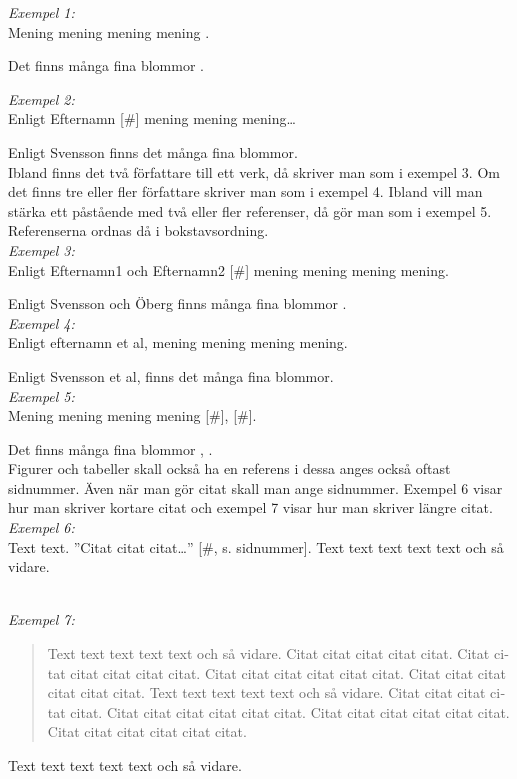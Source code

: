 \documentclass[a4paper,12pt]{article} %
\begin{document}
{\em Exempel 1:}\\
Mening mening mening mening \cite{sven01}. 

Det finns många fina blommor \cite{sven01}.

{\em Exempel 2:}\\
Enligt Efternamn [\#] mening mening mening…

Enligt Svensson \cite{sven01} finns det många fina blommor.\\

Ibland finns det två författare till ett verk, då skriver man som i exempel 3. Om det finns tre eller fler författare skriver man som i exempel 4. Ibland vill man stärka ett påstående med två eller fler referenser, då gör man som i exempel 5. Referenserna ordnas då i bokstavsordning. \\

{\em Exempel 3:}\\
Enligt Efternamn1 och Efternamn2 [\#] mening mening mening mening. 

Enligt Svensson och Öberg finns många fina blommor \cite{sven02}.\\

{\em Exempel 4:}\\
Enligt efternamn et al, \cite{Creswell2014} mening mening mening mening.

Enligt Svensson et al, \cite{sven07} finns det många fina blommor.\\

{\em Exempel 5:}\\ 
Mening mening mening mening [\#], [\#]. 

Det finns många fina blommor \cite{sven01}, \cite{sven02}.\\

Figurer och tabeller skall också ha en referens i dessa anges också oftast sidnummer. Även när man gör citat skall man ange sidnummer. Exempel 6 visar hur man skriver kortare citat och exempel 7 visar hur man skriver längre citat.\\

{\em Exempel 6:}\\ 
Text text. ”Citat citat citat…”  [\#, s. sidnummer]. Text text text text text och så vidare. 

 \cite[s. 23]{Creswell2014} \\

{\em Exempel 7:}
\hyphenblockcquote{swedish}[s. 1]{Creswell2014}{
Text text text text text och så vidare. Citat citat citat citat citat. Citat citat citat citat citat citat. Citat citat citat citat citat citat. Citat citat citat citat citat citat. Text text text text text och så vidare. Citat citat citat citat citat. Citat citat citat citat citat citat. Citat citat citat citat citat citat. Citat citat citat citat citat citat.}
Text text text text text och så vidare. \\
\end{document}
